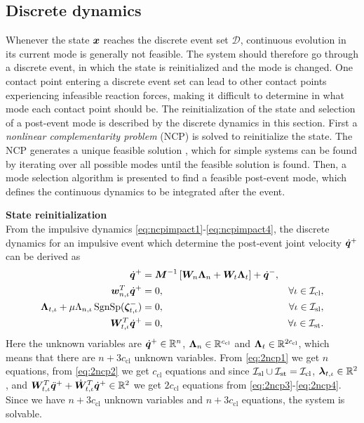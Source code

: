 \documentclass[../DC2017114Bouma.tex]{subfiles}
\begin{document}
\subsection{Discrete dynamics}\label{sec:2discdyn}
Whenever the state ${\boldsymbol{x}}$ reaches the discrete event set $\mathcal{D}$, continuous evolution in its current mode is generally not feasible. The system should therefore go through a discrete event, in which the state is reinitialized and the mode is changed. One contact point entering a discrete event set can lead to other contact points experiencing infeasible reaction forces, making it difficult to determine in what mode each contact point should be. The reinitialization of the state and selection of a post-event mode is described by the discrete dynamics in this section. First a \textit{nonlinear complementarity problem} (NCP) is solved to reinitialize the state. The NCP generates a unique feasible solution \cite{Delassus1917}, which for simple systems can be found by iterating over all possible modes until the feasible solution is found. Then, a mode selection algorithm is presented to find a feasible post-event mode, which defines the continuous dynamics to be integrated after the event. 
%

\textbf{State reinitialization}\\
From the impulsive dynamics \eqref{eq:ncpimpact1}-\eqref{eq:ncpimpact4}, the discrete dynamics for an impulsive event which determine the post-event joint velocity $\dot{{\boldsymbol{q}}}^+$ can be derived as
\begin{align}
\dot{{\boldsymbol{q}}}^+ &= {\boldsymbol{M}}^{-1}\left[{\boldsymbol{W}}_{n}\boldsymbol{\Lambda}_{n} + {\boldsymbol{W}}_{t}\boldsymbol{\Lambda}_{t}\right] + \dot{{\boldsymbol{q}}}^-, \label{eq:2ncp1}\\
{\boldsymbol{w}}^T_{n,\iota}\dot{{\boldsymbol{q}}}^+ &= 0, &\forall \iota\in\mathcal{I}_{\text{cl}},\label{eq:2ncp2}\\
\boldsymbol{\Lambda}_{t,\iota} + \mu\Lambda_{n,\iota}\operatorname{\text{SgnSp}}(\boldsymbol{\zeta}^-_{t,\iota})&= 0, &\forall \iota\in\mathcal{I}_{\text{sl}},\label{eq:2ncp3}\\
{\boldsymbol{W}}^T_{t,\iota}\dot{{\boldsymbol{q}}}^+ &= 0, &\forall \iota\in\mathcal{I}_{\text{st}}.\label{eq:2ncp4}
\end{align}
Here the unknown variables are $\dot{{\boldsymbol{q}}}^+\in\mathbb{R}^{n}$, $\boldsymbol{\Lambda}_{n}\in\mathbb{R}^{c_{\text{cl}}}$ and $\boldsymbol{\Lambda}_{t}\in\mathbb{R}^{2c_{\text{cl}}}$, which means that there are $n+3c_{\text{cl}}$ unknown variables. From \eqref{eq:2ncp1} we get $n$ equations, from \eqref{eq:2ncp2} we get $c_{\text{cl}}$ equations and since $\mathcal{I}_{\text{sl}}\cup\mathcal{I}_{\text{st}}=\mathcal{I}_{\text{cl}}$, $\boldsymbol{\lambda}_{t,\iota}\in\mathbb{R}^2$, and ${\boldsymbol{W}}^T_{t,\iota}\ddot{{\boldsymbol{q}}}^+ + \dot{{\boldsymbol{W}}}^T_{t,\iota}\dot{{\boldsymbol{q}}}^+ \in\mathbb{R}^2$ we get $2c_{\text{cl}}$ equations from \eqref{eq:2ncp3}-\eqref{eq:2ncp4}. Since we have $n+3c_{\text{cl}}$ unknown variables and $n+3c_{\text{cl}}$ equations, the system is solvable.
\end{document}
